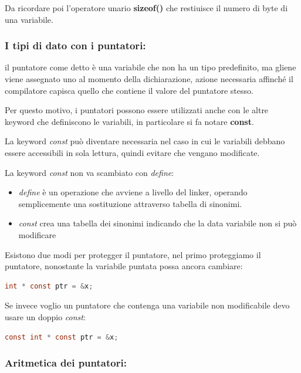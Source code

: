 \documentclass[
  paper=a4,
  oneside  ,captions=tableheading
]{scrbook}
\providecommand{\tightlist}{%
  \setlength{\itemsep}{0pt}\setlength{\parskip}{0pt}}
\begin{document}
Da ricordare poi l'operatore unario \textbf{sizeof()} che restiuisce il
numero di byte di una variabile.

\hypertarget{i-tipi-di-dato-con-i-puntatori}{%
\subsubsection{I tipi di dato con i
puntatori:}\label{i-tipi-di-dato-con-i-puntatori}}

il puntatore come detto è una variabile che non ha un tipo predefinito,
ma gliene viene assegnato uno al momento della dichiarazione, azione
necessaria affinché il compilatore capisca quello che contiene il valore
del puntatore stesso.

Per questo motivo, i puntatori possono essere utilizzati anche con le
altre keyword che definiscono le variabili, in particolare si fa notare
\textbf{const}.

La keyword \emph{const} può diventare necessaria nel caso in cui le
variabili debbano essere accessibili in sola lettura, quindi evitare che
vengano modificate.

La keyword \emph{const} non va scambiato con \emph{define}:

\begin{itemize}
\tightlist
\item
  \emph{define} è un operazione che avviene a livello del linker,
  operando semplicemente una sostituzione attraverso tabella di
  sinonimi.
\item
  \emph{const} crea una tabella dei sinonimi indicando che la data
  variabile non si può modificare
\end{itemize}

Esistono due modi per protegger il puntatore, nel primo proteggiamo il
puntatore, nonostante la variabile puntata possa ancora cambiare:

\begin{lstlisting}[language=C]
int * const ptr = &x; 
\end{lstlisting}

Se invece voglio un puntatore che contenga una variabile non
modificabile devo usare un doppio \emph{const}:

\begin{lstlisting}[language=C]
const int * const ptr = &x;
\end{lstlisting}

\hypertarget{aritmetica-dei-puntatori}{%
\subsubsection{Aritmetica dei
puntatori:}\label{aritmetica-dei-puntatori}}
\end{document}
